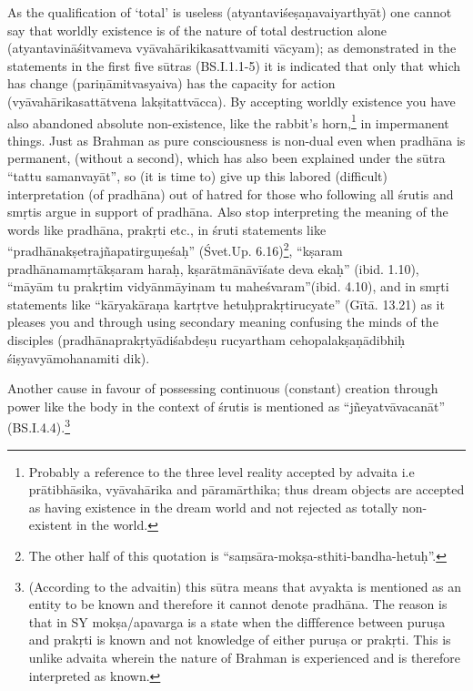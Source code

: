 \vskip 4pt


\vskip 4pt

As the qualification of ‘total’ is useless (atyantaviśeṣaṇavaiyarthyāt) one cannot say that worldly existence is of the nature of total destruction alone (atyantavināśitvameva vyāvahārikikasattvamiti vācyam); as demonstrated in the statements in the first five sūtras (BS.I.1.1-5) it is indicated that only that which has change (pariṇāmitvasyaiva) has the capacity for action (vyāvahārikasattātvena lakṣitattvācca). By accepting worldly existence you have also abandoned absolute non-existence, like the rabbit’s horn,\footnote{Probably a reference to the three level reality accepted by advaita i.e prātibhāsika, vyāvahārika and pāramārthika; thus dream objects are accepted as having existence in the dream world and not rejected as totally non-existent in the world.} in impermanent things.  Just as Brahman as pure consciousness is non-dual even when pradhāna is permanent, (without a second), which has also been explained under the sūtra “tattu samanvayāt”, so (it is time to) give up this labored (difficult) interpretation (of pradhāna) out of hatred for those who following all śrutis and smṛtis argue in support of pradhāna. Also stop interpreting the meaning of the words like pradhāna, prakṛti etc., in śruti statements like “pradhānakṣetrajñapatirguṇeśaḥ” (Śvet.Up. 6.16)\footnote{The other half of this quotation is “saṃsāra-mokṣa-sthiti-bandha-hetuḥ”.}, “kṣaram pradhānamamṛtākṣaram haraḥ, kṣarātmānāvīśate deva ekaḥ” (ibid. 1.10), “māyām tu prakṛtim vidyānmāyinam tu maheśvaram”(ibid. 4.10), and in smṛti statements like  “kāryakāraṇa kartṛtve hetuḥprakṛti\-rucyate” (Gītā. 13.21) as it pleases you and through using secondary meaning confusing the minds of the disciples (pradhānaprakṛtyādiśabdeṣu rucyartham cehopalakṣaṇādibhiḥ śiṣyavyāmohanamiti dik).

\newpage

Another cause in favour of possessing continuous (constant) creation through power like the body in the context of śrutis is mentioned as “jñeyatvāvacanāt” (BS.I.4.4).\footnote{(According to the advaitin) this sūtra means that avyakta is mentioned as an entity to be known and therefore it cannot denote pradhāna. The reason is that in SY mokṣa/apavarga is a state when the diffference between puruṣa and prakṛti is known and not knowledge of either puruṣa or prakṛti. This is unlike advaita wherein the nature of Brahman is experienced and is therefore interpreted as known.}

